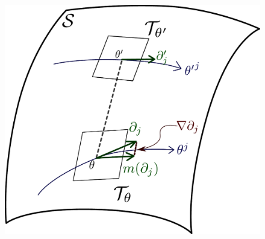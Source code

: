 \documentclass[11pt]{article}
\begin{document}
\begin{figure}[h]
\centering
\includegraphics[scale = 0.3]{fig2.pdf}
\caption{}
\end{figure}
\end{document}
